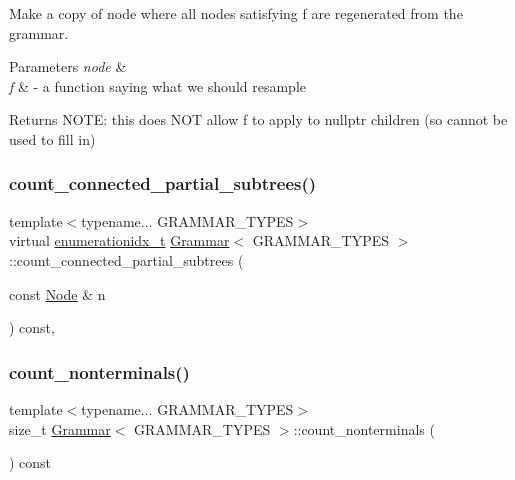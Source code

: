 Make a copy of node where all nodes satisfying f are regenerated from the grammar. 
\begin{DoxyParams}{Parameters}
{\em node} & \\
\hline
{\em f} & -\/ a function saying what we should resample \\
\hline
\end{DoxyParams}
\begin{DoxyReturn}{Returns}
N\+O\+TE\+: this does N\+OT allow f to apply to nullptr children (so cannot be used to fill in)
\end{DoxyReturn}
\mbox{\label{class_grammar_ad1e2c22753f18d1dcdd9d81576045e9f}} 
\subsubsection{\texorpdfstring{count\+\_\+connected\+\_\+partial\+\_\+subtrees()}{count\_connected\_partial\_subtrees()}}
{\footnotesize\ttfamily template$<$typename... G\+R\+A\+M\+M\+A\+R\+\_\+\+T\+Y\+P\+ES$>$ \\
virtual \hyperlink{_numerics_8h_a9fe2bbca873b046b2bd276fc6856bb88}{enumerationidx\+\_\+t} \hyperlink{class_grammar}{Grammar}$<$ G\+R\+A\+M\+M\+A\+R\+\_\+\+T\+Y\+P\+ES $>$\+::count\+\_\+connected\+\_\+partial\+\_\+subtrees (\begin{DoxyParamCaption}\item[{const \hyperlink{class_node}{Node} \&}]{n }\end{DoxyParamCaption}) const\hspace{0.3cm}{\ttfamily [inline]}, {\ttfamily [virtual]}}

\mbox{\label{class_grammar_a4aa05c747026932672a24fa1f7134115}} 
\subsubsection{\texorpdfstring{count\+\_\+nonterminals()}{count\_nonterminals()}\hspace{0.1cm}{\footnotesize\ttfamily [1/2]}}
{\footnotesize\ttfamily template$<$typename... G\+R\+A\+M\+M\+A\+R\+\_\+\+T\+Y\+P\+ES$>$ \\
size\+\_\+t \hyperlink{class_grammar}{Grammar}$<$ G\+R\+A\+M\+M\+A\+R\+\_\+\+T\+Y\+P\+ES $>$\+::count\+\_\+nonterminals (\begin{DoxyParamCaption}{ }\end{DoxyParamCaption}) const\hspace{0.3cm}{\ttfamily [inline]}}

